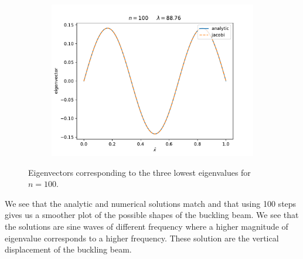 \documentclass[english,notitlepage]{revtex4-1}  %
\begin{document}
\begin{enumerate}[label= \alph*)]
\begin{figure}[H]
\begin{subfigure}{.45 \textwidth}
        \includegraphics[width=1.1\textwidth]{../figures/eigvec_100_2.pdf}
        \caption{}
        \label{fig:eigvec_100_2}
    \end{subfigure}
    \caption{Eigenvectors corresponding to the three lowest eigenvalues for $n=100$.}
    \label{fig:eigvec_100}
    \end{figure}

  We see that the analytic and numerical solutions match and that using 100 steps gives us a smoother plot of the possible shapes of the buckling beam. We see that the solutions are sine waves of different frequency where a higher magnitude of eigenvalue corresponds to a higher frequency. These solution are the vertical displacement of the buckling beam.
\end{enumerate}
\end{document}

